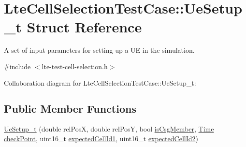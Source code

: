 \hypertarget{structLteCellSelectionTestCase_1_1UeSetup__t}{}\section{Lte\+Cell\+Selection\+Test\+Case\+:\+:Ue\+Setup\+\_\+t Struct Reference}
\label{structLteCellSelectionTestCase_1_1UeSetup__t}


A set of input parameters for setting up a UE in the simulation.  




{\ttfamily \#include $<$lte-\/test-\/cell-\/selection.\+h$>$}



Collaboration diagram for Lte\+Cell\+Selection\+Test\+Case\+:\+:Ue\+Setup\+\_\+t\+:
\subsection*{Public Member Functions}
\begin{DoxyCompactItemize}
\item 
\hyperlink{structLteCellSelectionTestCase_1_1UeSetup__t_afd347b8fcc61538b755bee73fd5f6730}{Ue\+Setup\+\_\+t} (double rel\+PosX, double rel\+PosY, bool \hyperlink{structLteCellSelectionTestCase_1_1UeSetup__t_a86d14f555665658a506313e5e7613267}{is\+Csg\+Member}, \hyperlink{classns3_1_1Time}{Time} \hyperlink{structLteCellSelectionTestCase_1_1UeSetup__t_aeb15c381f72d6800f421bead43ad16bb}{check\+Point}, uint16\+\_\+t \hyperlink{structLteCellSelectionTestCase_1_1UeSetup__t_a54e1f0460b1f6523099aec77d8888d4d}{expected\+Cell\+Id1}, uint16\+\_\+t \hyperlink{structLteCellSelectionTestCase_1_1UeSetup__t_a44ed53e08ab981aefba7dc11ac9210a3}{expected\+Cell\+Id2})
\end{DoxyCompactItemize}
